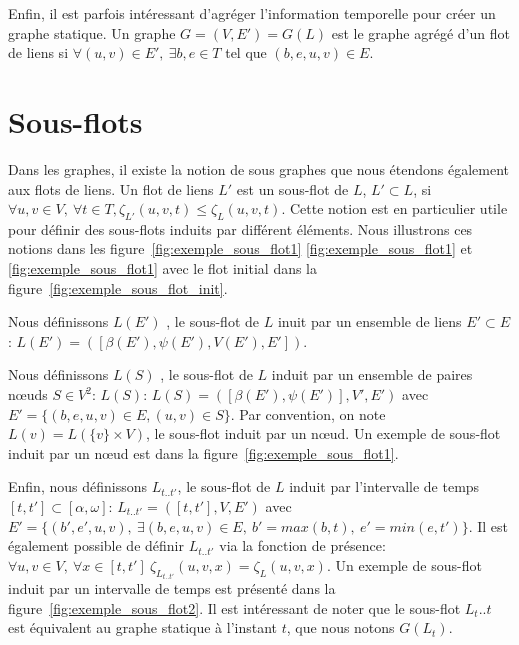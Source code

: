 Enfin, il est parfois intéressant d'agréger l'information temporelle pour créer un graphe statique.
Un graphe $G=(V,E')=G(L)$ est le graphe agrégé d'un flot de liens si $\forall (u,v) \in E',\ \exists b,e \in T$ tel que $(b,e,u,v) \in E$.




\section{Sous-flots}
Dans les graphes, il existe la notion de sous graphes que nous étendons également aux flots de liens.
Un flot de liens $L'$ est un sous-flot de $L$, $L' \subset L$, si  $\forall u,v \in V,\ \forall t\in T, \zeta_{L'}(u,v,t) \leq \zeta_{L}(u,v,t)$.
Cette notion est en particulier utile pour définir des sous-flots induits par différent éléments.
Nous illustrons ces notions dans les figure~\ref{fig:exemple_sous_flot1} \ref{fig:exemple_sous_flot1} et \ref{fig:exemple_sous_flot1} avec le flot initial dans la figure~\ref{fig:exemple_sous_flot_init}.
 
Nous définissons $L(E')$ , le sous-flot de $L$ inuit par un ensemble de liens $E' \subset E$: $L(E')=([\beta(E'),\psi(E'),V(E'),E'])$.

 
Nous définissons $L(S)$ , le sous-flot de $L$ induit par un ensemble de paires n\oe uds $S \in V^ 2$: $L(S)$: $L(S)=([\beta(E'),\psi(E')],V',E')$ avec $E'= \{(b,e,u,v) \in E, (u,v) \in S\}$.
Par convention, on note $L(v)= L(\{v\}\times V)$, le sous-flot induit par un n\oe ud.
Un exemple de sous-flot induit par un n\oe ud est dans la figure~\ref{fig:exemple_sous_flot1}.


Enfin, nous définissons $L_{t..t'}$, le sous-flot de $L$ induit par l'intervalle de temps $[t,t'] \subset [\alpha, \omega]$: $L_{t..t'}=([t, t'], V,E')$ avec $E'= \{(b',e',u,v),\ \exists (b,e,u,v) \in E,\ b'= max(b,t),\ e'=min(e,t')\}$.
Il est également possible de définir $L_{t..t'}$ via la fonction de présence: $\forall u,v \in V,\ \forall x \in [t,t']\  \zeta_{L_{t..t'}}(u,v,x) = \zeta_{L}(u,v,x)$.
Un exemple de sous-flot induit par un intervalle de temps est présenté dans la figure~\ref{fig:exemple_sous_flot2}.
Il est intéressant de noter que le sous-flot $L_t..t$ est équivalent au graphe statique à l'instant $t$,  que nous notons $G(L_t)$.


